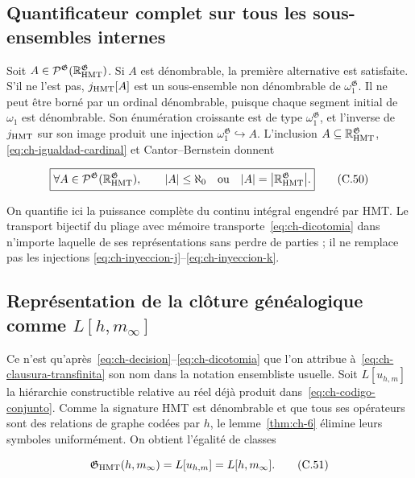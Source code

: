 \subsection{Quantificateur complet sur tous les sous-ensembles internes}

Soit
\(A\in\mathcal P^{\mathfrak G}
(\mathbb R_{\rm HMT}^{\mathfrak G})\). Si \(A\) est dénombrable, la
première alternative est satisfaite. S’il ne l’est pas, \(j_{\rm HMT}[A]\) est un sous-ensemble non
dénombrable de \(\omega_1^{\mathfrak G}\). Il ne peut être borné par un ordinal
dénombrable, puisque chaque segment initial de \(\omega_1\) est dénombrable. Son
énumération croissante est de type \(\omega_1^{\mathfrak G}\), et l’inverse de
\(j_{\rm HMT}\) sur son image produit une injection
\(\omega_1^{\mathfrak G}\hookrightarrow A\). L’inclusion
\(A\subseteq\mathbb R_{\rm HMT}^{\mathfrak G}\), \eqref{eq:ch-igualdad-cardinal} et
Cantor--Bernstein donnent

\[
 \boxed{
 \forall A\in\mathcal P^{\mathfrak G}
   (\mathbb R_{\rm HMT}^{\mathfrak G}),\qquad
 |A|\le\aleph_0
 \quad\text{ou}\quad
 |A|=\bigl|\mathbb R_{\rm HMT}^{\mathfrak G}\bigr|.}
\tag{C.50}\label{eq:ch-dicotomia}
\]

On quantifie ici la puissance complète du continu intégral engendré par
HMT. Le transport bijectif du pliage avec mémoire transporte~\eqref{eq:ch-dicotomia} dans n’importe laquelle
de ses représentations sans perdre de parties ; il ne remplace pas les injections
\eqref{eq:ch-inyeccion-j}--\eqref{eq:ch-inyeccion-k}.

\subsection{Représentation de la clôture généalogique comme \texorpdfstring{\(L[h,m_\infty]\)}{L[h,m-infinito]}}

Ce n'est qu'après~\eqref{eq:ch-decision}--\eqref{eq:ch-dicotomia} que l'on attribue à~\eqref{eq:ch-clausura-transfinita} son nom dans la notation ensembliste usuelle. Soit \(L[u_{h,m}]\) la hiérarchie constructible relative au réel déjà produit dans~\eqref{eq:ch-codigo-conjunto}. Comme la signature HMT est dénombrable et que tous ses opérateurs sont des relations de graphe codées par \(h\), le lemme~\ref{thm:ch-6} élimine leurs symboles uniformément. On obtient l'égalité de classes

\[
 \mathfrak G_{\rm HMT}(h,m_\infty)
 =L[u_{h,m}]=L[h,m_\infty].
\tag{C.51}\label{eq:ch-representacion-L}
\]


